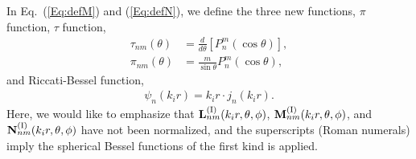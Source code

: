 \documentclass[journal=jacsat,manuscript=article,layout=traditional]{achemso}
\newcommand{\RomanI}{\scriptsize\textrm{I}}
\begin{document}
In Eq.~(\ref{Eq:defM}) and (\ref{Eq:defN}), we define the three new functions, $\pi$ function, $\tau$ function,
\begin{align}
    \label{Eq:tau}
    \tau_{nm}(\theta) &= \frac{d}{d\theta}\left[P_n^m\left(\cos{\theta}\right)\right],\\
    \label{Eq:pi}
    \pi_{nm}(\theta) &= \frac{m}{\sin\theta}P_n^m\left(\cos{\theta}\right),
\end{align}
and Riccati-Bessel function,
\begin{align}
    \label{rbf}
    \psi_n(k_ir) = k_ir\cdot j_n(k_ir).
\end{align}
Here, we would like to emphasize that $\mathbf{L}_{nm}^{(\RomanI)}(k_ir,\theta,\phi)$, $\mathbf{M}_{nm}^{(\RomanI)}(k_ir,\theta,\phi)$, and $\mathbf{N}_{nm}^{(\RomanI)}(k_ir,\theta,\phi)$ have not been normalized, and the superscripts (Roman numerals) imply the spherical Bessel functions of the first kind is applied.
\newpage
\end{document}
